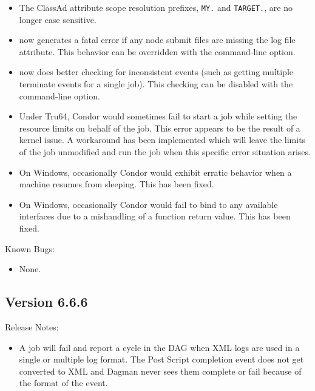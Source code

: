 \begin{itemize}
\item The ClassAd attribute scope resolution prefixes, \texttt{MY.} and
\texttt{TARGET.}, are no longer case sensitive.

\item {} now generates a fatal error if any node submit
files are missing the log file attribute.  This behavior can be
overridden with the  command-line option.

\item {} now does better checking for inconsistent events
(such as getting multiple terminate events for a single job).  This
checking can be disabled with the  command-line
option.

\item Under Tru64, Condor would sometimes fail to start a job while
	setting the resource limits on behalf of the job.
	This error appears to be the result of a kernel issue.
	A workaround has been implemented which will leave the limits
	of the job unmodified and run the job when this specific error
	situation arises.

\item On Windows, occasionally Condor would exhibit erratic behavior
when a machine resumes from sleeping. This has been fixed.

\item On Windows, occasionally Condor would fail to bind to any available
interfaces due to a mishandling of a function return value. This has
been fixed.

\end{itemize}

\noindent Known Bugs:

\begin{itemize}

\item None.

\end{itemize}


\subsection{\label{sec:New-6-6-6}Version 6.6.6}

\noindent Release Notes:

\begin{itemize}

\item A  job will fail and report a cycle in the DAG
when XML logs are used in a single or multiple log format. The Post
Script  completion event does not get converted to XML and Dagman
never sees them complete or fail because of the format of the event.

\end{itemize}


